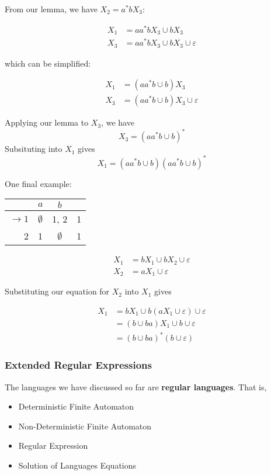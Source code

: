 From our lemma, we have \(X_2=a^*bX_3\):

\begin{align*}
      X_1 &= aa^*bX_3\cup bX_3\\
      X_3 &= aa^*bX_3\cup bX_3\cup\varepsilon
\end{align*}

which can be simplified:

\begin{align*}
      X_1 &= (aa^*b\cup b)X_3\\
      X_3 &= (aa^*b\cup b)X_3\cup\varepsilon
\end{align*}

Applying our lemma to \(X_3\), we have \[X_3=(aa^*b\cup b)^*\] Subsituting into \(X_1\) gives \[X_1=(aa^*b\cup b)(aa^*b\cup b)^*\] 

One final example:

\begin{center}\begin{tabular}{r| c c r}
      & \(a\) & \(b\) & \\\bottomrule
      \(\to 1\) & \(\emptyset\) & 1, 2 & 1\\
            2 & 1 & \(\emptyset\) & 1\\
 \end{tabular}\end{center}

\begin{align*}
      X_1 &= bX_1\cup bX_2\cup\varepsilon\\
      X_2 &= aX_1\cup\varepsilon
\end{align*}

Substituting our equation for \(X_2\) into \(X_1\) gives 

\begin{align*}
      X_1&=bX_1\cup b(aX_1\cup\varepsilon)\cup\varepsilon\\
         &=(b\cup ba)X_1\cup b\cup\varepsilon\\
         &=(b\cup ba)^*(b\cup\varepsilon)
\end{align*}

\subsubsection{Extended Regular Expressions}
The languages we have discussed so far are \textbf{regular languages}. That is, 

\begin{itemize}
      \item Deterministic Finite Automaton
      \item Non-Deterministic Finite Automaton
      \item Regular Expression
      \item Solution of Languages Equations
\end{itemize}

